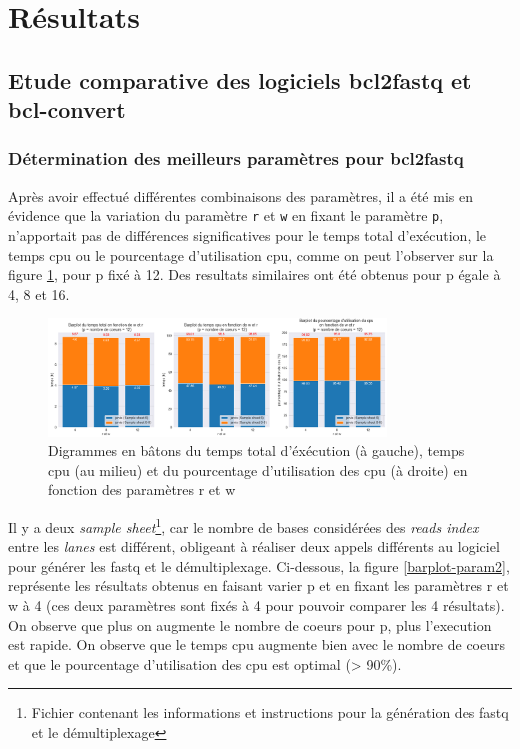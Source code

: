 \section{Résultats}
\subsection{Etude comparative des logiciels bcl2fastq et bcl-convert}
\subsubsection{Détermination des meilleurs paramètres pour bcl2fastq}
Après avoir effectué différentes combinaisons des paramètres, il a été mis en évidence que la variation du paramètre \texttt{r} et \texttt{w} en fixant le paramètre \texttt{p}, n'apportait pas de différences significatives pour le temps total d'exécution, le temps cpu ou le pourcentage d'utilisation cpu, comme on peut l'observer sur la figure \ref{barplot-param}, pour p fixé à 12. Des resultats similaires ont été obtenus pour p égale à 4, 8 et 16. 

\begin{figure}[H]
    \centering
    \includegraphics[width=0.8\textwidth]{img/barplot_cum_jarvis2.png}
    \caption{\footnotesize{Digrammes en bâtons du temps total d'éxécution (à gauche), temps cpu (au milieu) et du pourcentage d'utilisation des cpu (à droite) en fonction des paramètres r et w}}
    \label{barplot-param}
\end{figure}

Il y a deux \emph{sample sheet}\footnote{Fichier contenant les informations et instructions pour la génération des fastq et le démultiplexage}, car le nombre de bases considérées des \emph{reads index} entre les \emph{lanes} est différent, obligeant à réaliser deux appels différents au logiciel pour générer les fastq et le démultiplexage. Ci-dessous, la figure \ref{barplot-param2}, représente les résultats obtenus en faisant varier p et en fixant les paramètres r et w à 4 (ces deux paramètres sont fixés à 4 pour pouvoir comparer les 4 résultats). On observe que plus on augmente le nombre de coeurs pour p, plus l'execution est rapide. On observe que le temps cpu augmente bien avec le nombre de coeurs et que le pourcentage d'utilisation des cpu est optimal (> 90\%).

